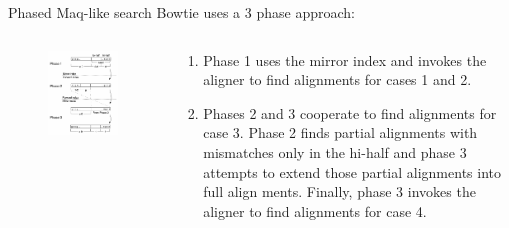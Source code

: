 \documentclass[mathserif]{beamer}
\begin{document}
\begin{frame}{Phased Maq-like search}
    Bowtie uses a 3 phase approach:
    \begin{columns}
        \begin{column}{.3\textwidth}
        \begin{figure}
            \includegraphics[scale=.25]{media/fig3.png}
        \end{figure}
        \end{column}
        \begin{column}{.7\textwidth}
            \begin{enumerate}
            \item Phase 1 uses the mirror index and invokes the
            aligner to find alignments for cases 1 and 2. 
            \item Phases 2 and 3 cooperate to find alignments for case 3. Phase 2 finds partial
            alignments with mismatches only in the hi-half and phase 3
            attempts to extend those partial alignments into full align
            ments. Finally, phase 3 invokes the aligner to find alignments
            for case 4.
            \end{enumerate}
        \end{column}
    \end{columns}
\end{frame}
\end{document}
